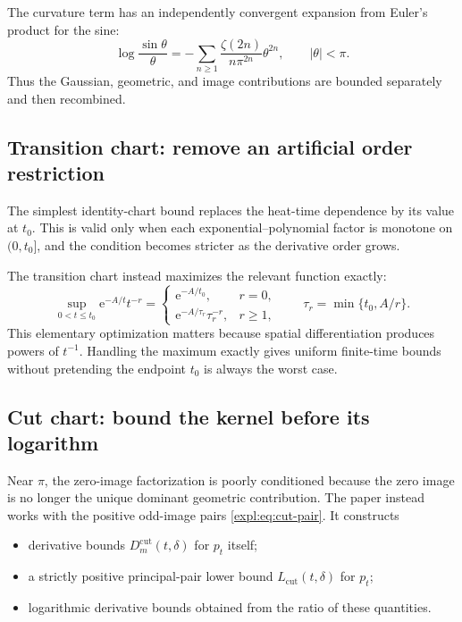 \documentclass[11pt]{article}
\theoremstyle{definition}
\newcommand{\e}{\mathrm{e}}
\begin{document}
The curvature term has an independently convergent expansion from Euler's
product for the sine:
\begin{equation}\label{expl:eq:sine-series}
 \log\frac{\sin\theta}{\theta}
 =-\sum_{n\ge1}\frac{\zeta(2n)}{n\pi^{2n}}\theta^{2n},
 \qquad |\theta|<\pi.
\end{equation}
Thus the Gaussian, geometric, and image contributions are bounded separately
and then recombined.

\subsection{Transition chart: remove an artificial order restriction}

The simplest identity-chart bound replaces the heat-time dependence by its
value at $t_0$.  This is valid only when each exponential--polynomial factor
is monotone on $(0,t_0]$, and the condition becomes stricter as the derivative
order grows.

The transition chart instead maximizes the relevant function exactly:
\begin{equation}\label{expl:eq:H}
 \sup_{0<t\le t_0}\e^{-A/t}t^{-r}
 =\begin{cases}
 \e^{-A/t_0},&r=0,\\[2mm]
 \e^{-A/\tau_r}\tau_r^{-r},&r\ge1,
 \end{cases}
 \qquad \tau_r=\min\{t_0,A/r\}.
\end{equation}
This elementary optimization matters because spatial differentiation produces
powers of $t^{-1}$.  Handling the maximum exactly gives uniform finite-time
bounds without pretending the endpoint $t_0$ is always the worst case.

\subsection{Cut chart: bound the kernel before its logarithm}

Near $\pi$, the zero-image factorization is poorly conditioned because the
zero image is no longer the unique dominant geometric contribution.  The
paper instead works with the positive odd-image pairs
\eqref{expl:eq:cut-pair}.  It constructs
\begin{itemize}
\item derivative bounds $D_m^{\mathrm{cut}}(t,\delta)$ for $p_t$ itself;
\item a strictly positive principal-pair lower bound
$L_{\mathrm{cut}}(t,\delta)$ for $p_t$;
\item logarithmic derivative bounds obtained from the ratio of these
quantities.
\end{itemize}
\end{document}

